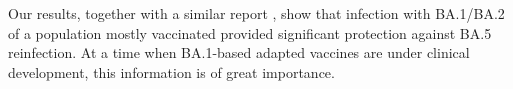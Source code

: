 Our results, together with a similar report \citep{altarawneh2022ProtectionSARSCoV2}, show that infection with BA.1/BA.2 of a population mostly vaccinated provided significant protection against BA.5 reinfection. At a time when BA.1-based adapted vaccines are under clinical development, this information is of great importance.





